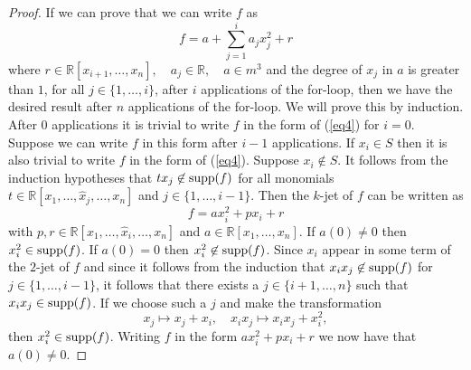 \documentclass{amsproc}
\begin{document}
\begin{proof}
If we can prove that we can write $f$ as \begin{equation}\label{eq4}
f=a+\sum_{j=1}^i a_jx_j^2+r
\end{equation}
where
$r\in\mathbb R[x_{i+1},\ldots,x_n],\quad a_j\in\mathbb R,\quad a\in m^3$ and the degree of $x_j$ in $a$ is greater than $1$, for all $j\in\{1,\ldots,i\}$,
after $i$ applications of the for-loop, then we have the desired result after $n$ applications of the for-loop. We will prove this by induction. After $0$ applications it is trivial to write $f$ in the form of (\ref{eq4}) for $i=0$. Suppose we can write $f$ in this form after $i-1$ applications. If $x_i\in S$ then it is also trivial to write $f$ in the form of (\ref{eq4}). Suppose  $x_i\not\in S$. It follows from the induction hypotheses that $tx_j\not\in \textnormal{supp}(f)$ for all monomials $t\in\mathbb R[x_1,\ldots,\hat x_j,\ldots,x_n]$ and $j\in\{1,\ldots,i-1\}$. Then the $k$-jet of $f$ can be written as
\[f=ax_i^2+px_i+r\]
with $p,r\in\mathbb R[x_1,\ldots,\hat x_i,\ldots,x_n]$ and $a\in\mathbb R[x_1,\ldots,x_n]$. If $a(0)\neq 0$ then $x_i^2\in\textnormal{supp}(f)$. If $a(0)=0$ then $x_i^2\not\in\textnormal{supp}(f)$. Since $x_i$ appear in some term of the $2$-jet of $f$ and since it follows from the induction that $x_ix_j\not\in\textnormal{supp}(f)$ for $j\in\{1,\ldots,i-1\}$, it follows that there exists a $j\in\{i+1,\ldots,n\}$ such that $x_ix_j\in\textnormal{supp}(f)$. If we choose such a $j$ and make the transformation
\begin{equation}\label{eq2}
x_j\mapsto x_j+x_i,\quad x_ix_j\mapsto x_ix_j+x_i^2,
\end{equation}
then $x_i^2\in\textnormal{supp}(f)$. Writing $f$ in the form $ax_i^2+px_i+r$ we now have that $a(0)\neq0$.


\end{proof}
\end{document}
